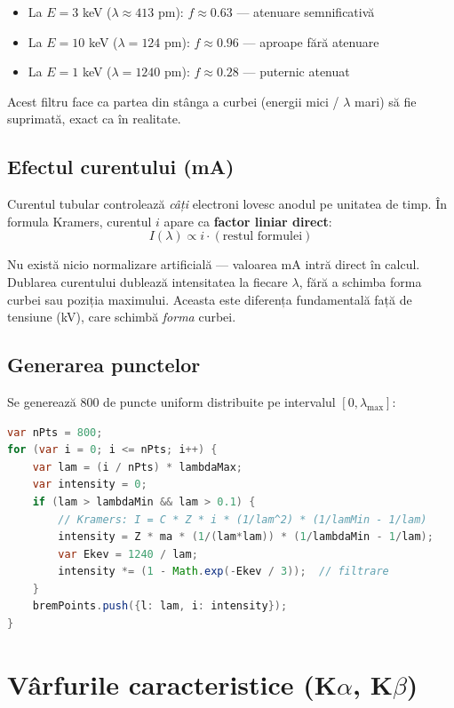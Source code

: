 \documentclass[12pt,a4paper]{article}
\begin{document}
\begin{itemize}[leftmargin=2em]
    \item La $E = 3$ keV ($\lambda \approx 413$ pm): $f \approx 0.63$ — atenuare semnificativă
    \item La $E = 10$ keV ($\lambda = 124$ pm): $f \approx 0.96$ — aproape fără atenuare
    \item La $E = 1$ keV ($\lambda = 1240$ pm): $f \approx 0.28$ — puternic atenuat
\end{itemize}

Acest filtru face ca partea din stânga a curbei (energii mici / $\lambda$ mari) să fie suprimată, exact ca în realitate.

\subsection{Efectul curentului (mA)}

Curentul tubular controlează \emph{câți} electroni lovesc anodul pe unitatea de timp. În formula Kramers, curentul $i$ apare ca \textbf{factor liniar direct}:
\[
    I(\lambda) \propto i \cdot (\text{restul formulei})
\]

Nu există nicio normalizare artificială — valoarea mA intră direct în calcul. Dublarea curentului dublează intensitatea la fiecare $\lambda$, fără a schimba forma curbei sau poziția maximului. Aceasta este diferența fundamentală față de tensiune (kV), care schimbă \emph{forma} curbei.

\subsection{Generarea punctelor}

Se generează 800 de puncte uniform distribuite pe intervalul $[0, \lambda_{\max}]$:

\begin{lstlisting}[language=Java]
var nPts = 800;
for (var i = 0; i <= nPts; i++) {
    var lam = (i / nPts) * lambdaMax;
    var intensity = 0;
    if (lam > lambdaMin && lam > 0.1) {
        // Kramers: I = C * Z * i * (1/lam^2) * (1/lamMin - 1/lam)
        intensity = Z * ma * (1/(lam*lam)) * (1/lambdaMin - 1/lam);
        var Ekev = 1240 / lam;
        intensity *= (1 - Math.exp(-Ekev / 3));  // filtrare
    }
    bremPoints.push({l: lam, i: intensity});
}
\end{lstlisting}


\section{Vârfurile caracteristice (K$\alpha$, K$\beta$)}
\end{document}
